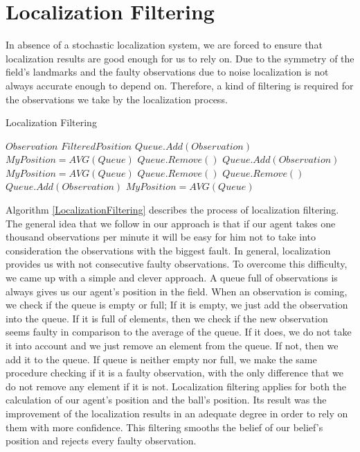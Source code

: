 \section{Localization Filtering}
In absence of a stochastic localization system, we are forced to ensure that localization results are good enough for us to rely on. Due to the symmetry of the field's landmarks and the faulty observations due to noise localization is not always accurate enough to depend on. Therefore, a kind of filtering is required for the observations we take by the localization process.
\begin{algorithm}[htb!]
\caption{Localization Filtering}
\label{LocalizationFiltering}
\begin{algorithmic}[1]
$Observation$
$FilteredPosition$
\STATE $Queue.Add(Observation)$
\STATE $MyPosition = AVG(Queue)$
\STATE $Queue.Remove()$
\ELSE
\STATE $Queue.Add(Observation)$
\STATE $MyPosition = AVG(Queue)$
\ENDIF
\ELSE
{}
\STATE $Queue.Remove()$
\ELSE
\STATE $Queue.Remove()$
\STATE $Queue.Add(Observation)$
\STATE $MyPosition = AVG(Queue)$
\ENDIF
\ENDIF
\ENDIF
\end{algorithmic}
\end{algorithm}
Algorithm \ref{LocalizationFiltering} describes the process of localization filtering. The general idea that we follow in our approach is that if our agent takes one thousand observations per minute it will be easy for him not to take into consideration the observations with the biggest fault. In general, localization provides us with not consecutive faulty observations. To overcome this difficulty, we came up with a simple and clever approach. A queue full of observations is always gives us our agent's position in the field. When an observation is coming, we check if the queue is empty or full; If it is empty, we just add the observation into the queue. If it is full of elements, then we check if the new observation seems faulty in comparison to the average of the queue. If it does, we do not take it into account and we just remove an element from the queue. If not, then we add it to the queue.
If queue is neither empty nor full, we make the same procedure checking if it is a faulty observation, with the only difference that we do not remove any element if it is not. Localization filtering applies for both the calculation of our agent's position and the ball's position. Its result was the improvement of the localization results in an adequate degree in order to rely on them with more confidence. This filtering smooths the belief of our belief's position and rejects every faulty observation.







